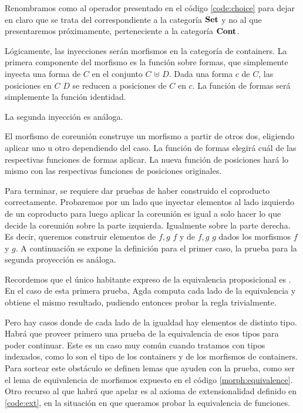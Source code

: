 
Renombramos como \AgdaFunction{$[\_,\_]_{\Set}$} al operador \AgdaFunction{[\_,\_]} presentado en el código \ref{code:choice} para dejar en claro que se trata del correspondiente a la categoría $\mathbf{Set}$ y no al que presentaremos próximamente, perteneciente a la categoría $\mathbf{Cont}$.

Lógicamente, las inyecciones serán morfismos en la categoría de containers. La primera componente del morfismo es la función sobre formas, que simplemente inyecta una forma de $C$ en el conjunto \Sh $C$ $\uplus$ \Sh $D$. Dada una forma $c$ de $C$, las posiciones en  $C$ $D$ se reducen a posiciones de $C$ en $c$. La función de formas será simplemente la función identidad.


La segunda inyección es análoga.

El morfismo de coreunión construye un morfismo a partir de otros dos, eligiendo aplicar uno u otro dependiendo del caso. La función de formas elegirá cuál de las respectivas funciones de formas aplicar. La nueva función de posiciones hará lo mismo con las respectivas funciones de posiciones originales. 


Para terminar, se requiere dar pruebas de haber construido el coproducto correctamente. Probaremos por un lado que
inyectar elementos al lado izquierdo de un coproducto para luego aplicar la coreunión es igual a solo hacer lo que decide la coreunión sobre la parte izquierda. Igualmente sobre la parte derecha.
Es decir, queremos construir elementos de \AgdaFunction{$[$} $f , g$ \AgdaFunction{$]\ \circ\ \iota_{1} \cong$} $f$ y de \AgdaFunction{$[$} $f , g$ \AgdaFunction{$]\ \circ\ \iota_{2} \cong$} $g$ dados los morfismos $f$ y $g$. A continuación se expone la definición para el primer caso, la prueba para la segunda proyección es análoga.




Recordemos que el único habitante expreso de la equivalencia proposicional es . En el caso de esta primera prueba, Agda computa cada lado de la equivalencia y obtiene el mismo resultado, pudiendo entonces probar la regla trivialmente.

Pero hay casos donde de cada lado de la igualdad hay elementos de distinto tipo. Habrá que proveer primero una prueba de la equivalencia de esos tipos para poder continuar. Este es un caso muy común cuando tratamos con tipos indexados, como lo son el tipo de los containers y de los morfismos de containers. Para sortear este obstáculo se definen lemas que ayuden con la prueba, como ser el lema de equivalencia de morfismos expuesto en el código \ref{morph:equivalence}. Otro recurso al que habrá que apelar es al axioma de extensionalidad definido en \ref{code:ext}, en la situación en que queramos probar la equivalencia de funciones.

